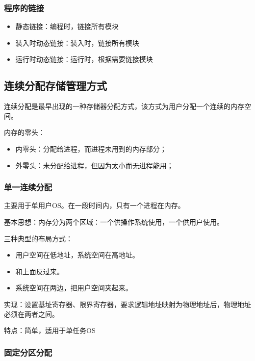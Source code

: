 \documentclass[12pt, a4paper, oneside]{ctexart}
\begin{document}
\subsubsection{程序的链接}

\begin{itemize}
    \item 静态链接：编程时，链接所有模块
    \item 装入时动态链接：装入时，链接所有模块
    \item 运行时动态链接：运行时，根据需要链接模块
\end{itemize}

\subsection{连续分配存储管理方式}

连续分配是最早出现的一种存储器分配方式，该方式为用户分配一个连续的内存空间。

内存的零头：
\begin{itemize}
    \item 内零头：分配给进程，而进程未用到的内存部分；
    \item 外零头：未分配给进程，但因为太小而无进程能用；
\end{itemize}

\subsubsection{单一连续分配}

主要用于单用户OS。在一段时间内，只有一个进程在内存。

基本思想：内存分为两个区域：一个供操作系统使用，一个供用户使用。

三种典型的布局方式：

\begin{itemize}
    \item 用户空间在低地址，系统空间在高地址。
    \item 和上面反过来。
    \item 系统空间在两边，把用户空间夹起来。
\end{itemize}

实现：设置基址寄存器、限界寄存器，要求逻辑地址映射为物理地址后，物理地址必须在两者之间。

特点：简单，适用于单任务OS

\subsubsection{固定分区分配}
\end{document}
